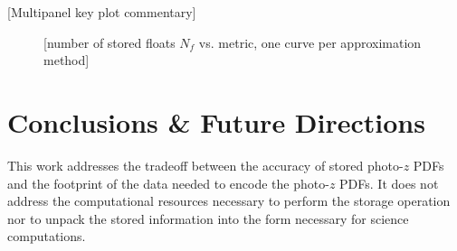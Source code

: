 \documentclass[\docopts]{\docclass}
\begin{document}
%

[Multipanel key plot commentary]

\begin{figure}
\caption{[number of stored floats $N_{f}$ vs. metric, one curve per approximation method]\label{fig:results}}
\end{figure}


%



\section{Conclusions \& Future Directions}
\label{sec:conclusions}

%
%


This work addresses the tradeoff between the accuracy of stored photo-$z$ PDFs and the footprint of the data needed to encode the photo-$z$ PDFs.  It does not address the computational resources necessary to perform the storage operation nor to unpack the stored information into the form necessary for science computations.
\end{document}
